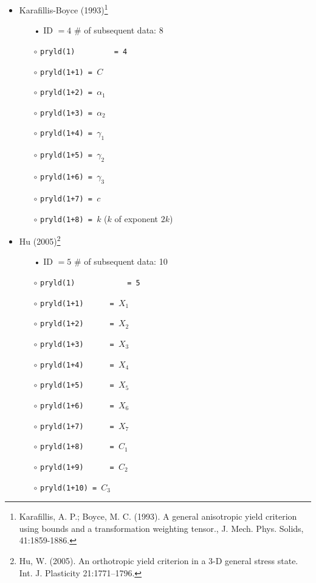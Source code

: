 \documentclass[11pt,a4paper,twoside,final,onecolumn,titlepage]{article}
\begin{document}
\begin{itemize}
	\item Karafillis-Boyce (1993)\footnote{Karafillis, A. P.; Boyce, M. C. (1993). A general anisotropic yield criterion using bounds and a transformation weighting tensor., J. Mech. Phys. Solids, 41:1859-1886.}
	\begin{itemize}
		\item[•] ID $= 4$ \hspace{100pt}	\# of subsequent data: 8
		\item[$\circ$] \texttt{pryld(1)\,\,\,\,\,\,\,\,\,= 4}
		\item[$\circ$] \texttt{pryld(1+1) = $C$}
		\item[$\circ$] \texttt{pryld(1+2) = $\alpha_1$}
		\item[$\circ$] \texttt{pryld(1+3) = $\alpha_2$}
		\item[$\circ$] \texttt{pryld(1+4) = $\gamma_1$}
		\item[$\circ$] \texttt{pryld(1+5) = $\gamma_2$}
		\item[$\circ$] \texttt{pryld(1+6) = $\gamma_3$}
		\item[$\circ$] \texttt{pryld(1+7) = $c$}
		\item[$\circ$] \texttt{pryld(1+8) = $k$} ($k$ of exponent $2k$)\\
	\end{itemize}
\end{itemize}

\begin{itemize}
	\item Hu (2005)\footnote{Hu, W. (2005). An orthotropic yield criterion in a 3-D general stress state. Int. J. Plasticity 21:1771–1796.}
	\begin{itemize}
		\item[•] ID $= 5$	\hspace{100pt}	\# of subsequent data: 10
		\item[$\circ$] \texttt{pryld(1)\,\,\,\,\,\,\,\,\,\,\,\,= 5}
		\item[$\circ$] \texttt{pryld(1+1)\,\,\,\,\,\,= $X_1$}
		\item[$\circ$] \texttt{pryld(1+2)\,\,\,\,\,\,= $X_2$}
		\item[$\circ$] \texttt{pryld(1+3)\,\,\,\,\,\,= $X_3$}
		\item[$\circ$] \texttt{pryld(1+4)\,\,\,\,\,\,= $X_4$}
		\item[$\circ$] \texttt{pryld(1+5)\,\,\,\,\,\,= $X_5$}
		\item[$\circ$] \texttt{pryld(1+6)\,\,\,\,\,\,= $X_6$}
		\item[$\circ$] \texttt{pryld(1+7)\,\,\,\,\,\,= $X_7$}
		\item[$\circ$] \texttt{pryld(1+8)\,\,\,\,\,\,= $C_1$}
		\item[$\circ$] \texttt{pryld(1+9)\,\,\,\,\,\,= $C_2$}
		\item[$\circ$] \texttt{pryld(1+10) = $C_3$}\\
	\end{itemize}
\end{itemize}
\end{document}
